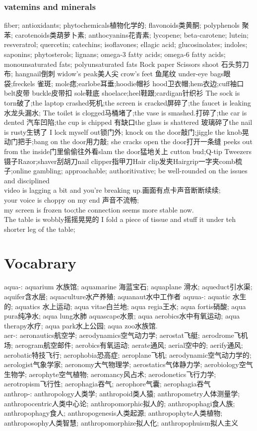 \documentclass[a4paper,12pt]{article}
\begin{document}
\subsubsection{vatemins and minerals} 
fiber; antioxidants; phytochemicals植物化学的; flavonoids类黄酮; polyphenols 聚苯; carotenoids类葫萝卜素; anthocyanins花青素; lycopene; beta-carotene; lutein; resveratrol; quercetin; catechins; isoflavones; ellagic acid; glucosinolates; indoles; saponins; phytosterols; lignans; omega-3 fatty acids; omega-6 fatty acids; monounsaturated fats; polyunsaturated fats
Rock paper Scissors shoot 石头剪刀布;
hangnail倒刺 widow's peak美人尖 crow's feet 鱼尾纹 under-eye bags眼袋;freckels 雀斑; mole痣;earlobe耳垂;hoodie帽衫 hood卫衣帽;hem衣边;cuff袖口belt皮带 buckle皮带扣 sole鞋底 shoelace;heel鞋跟;cardigan针织衫
The sock is torn破了;the laptop crashed死机;the screen is cracked屏碎了;the faucet is leaking水龙头漏水; The toilet is clogged马桶堵了;the vase is smashed.打碎了;the car is dented 汽车凹陷;the cup is chipped 有缺口the glass is shattered 玻璃碎了the nail is rusty生锈了
I lock myself out锁门外; knock on the door敲门;jiggle the knob晃动门把手;bang on the door用力敲; she cracks open the door打开一条缝 peeks out from the inside门里偷偷往外看slam the door猛地关上 cutton bud;Q-tip
Tweezers镊子Razor;shaver刮胡刀nail clipper指甲刀Hair clip发夹Hairgrip一字夹comb梳子;online gambling; approachable; authoritivative; be well-rounded on the issues and disciplined
\\video is lagging a bit and you're breaking up.画面有点卡声音断断续续;\\your voice is choppy on my end 声音不流畅;\\my screen is frozen too;the connection seems more stable now.
\\The table is wobbly摇摇晃晃的 I fold a piece of tissue and stuff it under teh shorter leg of the table;
\section{Vocabrary}
aqua-: aquarium 水族馆; aquamarine 海蓝宝石; aquaplane 滑水; aqueduct引水渠; aquifer含水层; aquaculture水产养殖; aquanaut水中工作者 aquua-: aquatic 水生的; aquatics 水上运动; aqua vitae白兰地; aqua regia王水; aqua fortis硝酸; aqua pura纯净水; aqua lung水肺 aquascape水景; aqua aerobics水中有氧运动; aqua therapy水疗; aqua park水上公园; aqua zoo水族馆.
\\aer-: aeronautics航空学; aerodynamics空气动力学; aerostat飞艇; aerodrome飞机场; aerogram航空邮件; aerobics有氧运动; aerate通风; aerial空中的; aerify通风; aerobatic特技飞行; aerophobia恐高症; aeroplane飞机; aerodynamic空气动力学的; aerologist气象学家; aeronomy大气物理学; aerostatics气体静力学; aerobiology空气生物学; aerophyte空气植物; aeromancy风占术; aerodonetics飞行力学; aerotropism飞行性; aerophagia吞气; aerophore气囊; aerophagia吞气
\\anthrop-: anthropology人类学; anthropoid类人猿; anthropometry人体测量学; anthropocentric人类中心论; anthropomorphic拟人的; anthropophagi食人族; anthropophagy食人; anthropogenesis人类起源; anthropophyte人类植物; anthroposophy人类智慧; anthropomorphize拟人化; anthropophuism拟人主义
\end{document}
